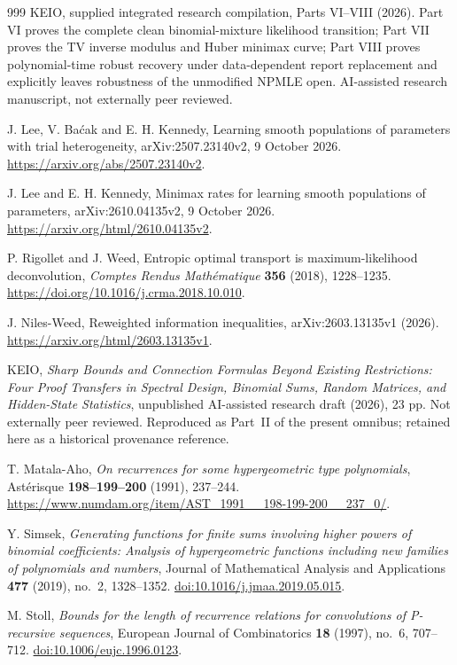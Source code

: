 \documentclass[11pt,a4paper]{article}
\theoremstyle{definition}
\theoremstyle{remark}
\numberwithin{equation}{section}
\begin{document}
\begin{thebibliography}{999}
KEIO, supplied integrated research compilation, Parts VI--VIII (2026).
Part VI proves the complete clean binomial-mixture likelihood transition;
Part VII proves the TV inverse modulus and Huber minimax curve;
Part VIII proves polynomial-time robust recovery under data-dependent
report replacement and explicitly leaves robustness of the unmodified
NPMLE open.  AI-assisted research manuscript, not externally peer reviewed.

J. Lee, V. Ba\'cak and E. H. Kennedy,
Learning smooth populations of parameters with trial heterogeneity,
arXiv:2507.23140v2, 9 October 2026.
\url{https://arxiv.org/abs/2507.23140v2}.

J. Lee and E. H. Kennedy,
Minimax rates for learning smooth populations of parameters,
arXiv:2610.04135v2, 9 October 2026.
\url{https://arxiv.org/html/2610.04135v2}.

P. Rigollet and J. Weed,
Entropic optimal transport is maximum-likelihood deconvolution,
\emph{Comptes Rendus Math\'ematique} \textbf{356} (2018), 1228--1235.
\url{https://doi.org/10.1016/j.crma.2018.10.010}.

J. Niles-Weed, Reweighted information inequalities,
arXiv:2603.13135v1 (2026).
\url{https://arxiv.org/html/2603.13135v1}.

KEIO, \emph{Sharp Bounds and Connection Formulas Beyond Existing
Restrictions: Four Proof Transfers in Spectral Design, Binomial Sums,
Random Matrices, and Hidden-State Statistics}, unpublished AI-assisted
research draft (2026), 23 pp. Not externally peer reviewed.
Reproduced as Part~II of the present omnibus; retained here as a historical provenance reference.

T. Matala-Aho,
\emph{On recurrences for some hypergeometric type polynomials},
Ast\'erisque \textbf{198--199--200} (1991), 237--244.
\url{https://www.numdam.org/item/AST_1991__198-199-200__237_0/}.

Y. Simsek,
\emph{Generating functions for finite sums involving higher powers of
binomial coefficients: Analysis of hypergeometric functions including
new families of polynomials and numbers},
Journal of Mathematical Analysis and Applications \textbf{477}
(2019), no.~2, 1328--1352.
\href{https://doi.org/10.1016/j.jmaa.2019.05.015}
{doi:10.1016/j.jmaa.2019.05.015}.

M. Stoll,
\emph{Bounds for the length of recurrence relations for convolutions
of P-recursive sequences},
European Journal of Combinatorics \textbf{18} (1997), no.~6, 707--712.
\href{https://doi.org/10.1006/eujc.1996.0123}
{doi:10.1006/eujc.1996.0123}.


\end{thebibliography}
\end{document}
